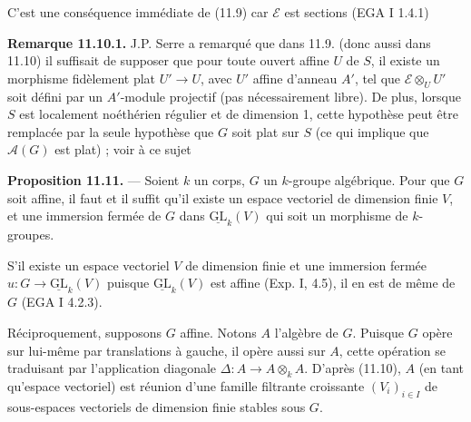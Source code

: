 \documentclass[11pt,a4paper]{article}
\begin{document}
C'est une conséquence immédiate de (11.9) car $\mathcal{E}$ est
 sections (EGA I
1.4.1)  

\textbf{Remarque 11.10.1.} J.P. Serre a remarqué que dans 11.9. (donc
aussi dans 11.10) il suffisait de supposer que pour toute ouvert affine
$U$ de $S$, il existe un morphisme fidèlement plat $U' \to U$, avec $U'$
affine d'anneau $A'$, tel que $\mathcal{E} \otimes_{U} U'$ soit défini par
un $A'$-module projectif (pas nécessairement libre). De plus, lorsque $S$
est localement noéthérien régulier et de dimension 1, cette hypothèse peut
être remplacée par la seule hypothèse que $G$ soit plat sur $S$ (ce qui
implique que $\mathcal{A}(G)$ est plat) ; voir à ce sujet  

\textbf{Proposition 11.11.} — Soient $k$ un corps, $G$ un 
$k$-groupe algébrique. Pour que $G$ soit affine, il faut et il suffit
qu'il existe un espace vectoriel de dimension finie $V$, et une immersion
fermée de $G$ dans $\underline{\mathrm{GL}}_{k}(V)$ qui soit un morphisme
de $k$-groupes.

S'il existe un espace vectoriel $V$ de dimension finie et une immersion
fermée $u : G \to \underline{\mathrm{GL}}_{k}(V)$ puisque
$\underline{\mathrm{GL}}_{k}(V)$ est affine (Exp. I, 4.5), il en est de
même de $G$ (EGA I 4.2.3).

Réciproquement, supposons $G$ affine. Notons $A$ l'algèbre de $G$. Puisque
$G$ opère sur lui-même par translations à gauche, il opère aussi sur $A$,
cette opération se traduisant par l'application 
diagonale $\Delta : A \longrightarrow A \otimes_{k} A$. D'après (11.10),
$A$ (en tant qu'espace vectoriel) est réunion d'une famille filtrante
croissante $(V_{i})_{i \in I}$ de sous-espaces vectoriels de dimension
finie stables sous $G$. \struck{\ill{}}

\end{document}
